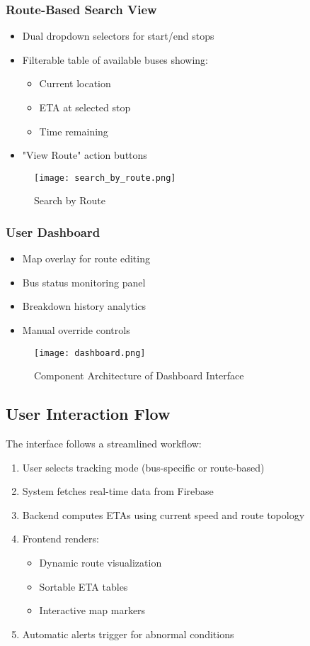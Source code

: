 \documentclass{article}
\begin{document}
\begin{multicols}{2}
\subsubsection{Route-Based Search View}
\begin{itemize}
\item Dual dropdown selectors for start/end stops
\item Filterable table of available buses showing:
\begin{itemize}
\item Current location
\item ETA at selected stop
\item Time remaining
\end{itemize}
\item "View Route" action buttons
\end{itemize}

\begin{figure}[H]
\centering
\texttt{[image: search\_by\_route.png]}
\caption{Search by Route}
\label{fig:component2}
\end{figure}

\subsubsection{User Dashboard}
\begin{itemize}
\item Map overlay for route editing
\item Bus status monitoring panel
\item Breakdown history analytics
\item Manual override controls
\end{itemize}

\begin{figure}[H]
\centering
\texttt{[image: dashboard.png]}
\caption{Component Architecture of Dashboard Interface}
\label{fig:dash}
\end{figure}

\subsection{User Interaction Flow}
The interface follows a streamlined workflow:

\begin{enumerate}
\item User selects tracking mode (bus-specific or route-based)
\item System fetches real-time data from Firebase
\item Backend computes ETAs using current speed and route topology
\item Frontend renders:
\begin{itemize}
\item Dynamic route visualization
\item Sortable ETA tables
\item Interactive map markers
\end{itemize}
\item Automatic alerts trigger for abnormal conditions
\end{enumerate}


\end{multicols}
\end{document}
